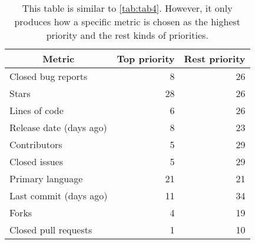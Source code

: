 \documentclass[11pt,review,sigplan,nonacm,natbib=false]{acmart}
\begin{document}

\begin{table}
    \begin{tabular}{lrr}
    \hline
     \multicolumn{1}{c}{Metric} &  \multicolumn{1}{c}{Top priority} &  \multicolumn{1}{c}{Rest priority} \\
    \hline
    Closed bug reports & 8 & 26 \\
    \hline
    Stars & 28 & 26 \\
    \hline
    Lines of code & 6 & 26 \\
    \hline
    Release date (days ago) & 8 & 23 \\
    \hline
    Contributors & 5 & 29 \\
    \hline
    Closed issues & 5 & 29 \\
    \hline
    Primary language & 21 & 21 \\
    \hline
    Last commit (days ago) & 11 & 34 \\
    \hline
    Forks & 4 & 19 \\
    \hline
    Closed pull requests & 1 & 10 \\
    \hline
    \end{tabular}
\caption{This table is similar to \cref{tab:tab4}. However, it only produces how a specific metric is chosen as the highest priority and the rest kinds of priorities.}
\label{tab:tab3}
\end{table}
  
\end{document}
